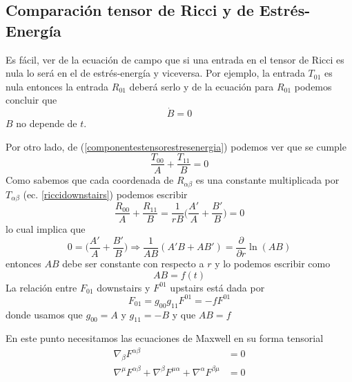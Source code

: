 \subsection*{\textbf{Comparación tensor de Ricci y de Estrés-Energía}}

Es fácil, ver de la ecuación de campo que si una entrada en el tensor de Ricci es nula lo será en el de estrés-energía y viceversa. Por ejemplo, la entrada $T_{01}$ es nula entonces la entrada $R_{01}$ deberá serlo y de la ecuación para $R_{01}$ podemos concluir que
\begin{equation}
    \dot{B} = 0 
\end{equation}
$B$ no depende de $t$.

Por otro lado, de (\ref{componentestensorestresenergia}) podemos ver que se cumple
\begin{equation}
    \frac{T_{00}}{A} + \frac{T_{11}}{B} = 0 
\end{equation}
Como sabemos que cada coordenada de $R_{\alpha\beta}$ es una constante multiplicada por $T_{\alpha\beta}$ (ec. \ref{riccidownstairs}) podemos escribir
\begin{equation}
\frac{R_{00}}{A} + \frac{R_{11}}{B} = \frac{1}{rB}\biggr(\frac{A'}{A}+\frac{B'}{B}\biggr) = 0 
\end{equation}
lo cual implica que 
\begin{equation}
0 = \biggr(\frac{A'}{A}+\frac{B'}{B}\biggr) \Rightarrow  \frac{1}{AB}(A'B+AB') = \frac{\partial}{\partial r} \ln(AB)
\end{equation}
entonces $AB$ debe ser constante con respecto a $r$ y lo podemos escribir como 
\begin{equation}
    AB = f(t)
\end{equation}
La relación entre $F_{01}$ downstairs y $F^{01}$ upstairs está dada por
\begin{equation}
    F_{01} = g_{00}g_{11}F^{01} = -fF^{01}
\end{equation}
donde usamos que $g_{00}=A$ y $g_{11}=-B$ y que $AB=f$ 

En este punto necesitamos las ecuaciones de Maxwell en su forma tensorial
\begin{equation}
\begin{split}
\nabla_\beta F^{\alpha\beta} &= 0 \\
\nabla^\mu F^{\alpha\beta} + \nabla^\beta F^{\mu\alpha}  +\nabla^\alpha F^{\beta\mu} &= 0
\end{split}
\end{equation}

